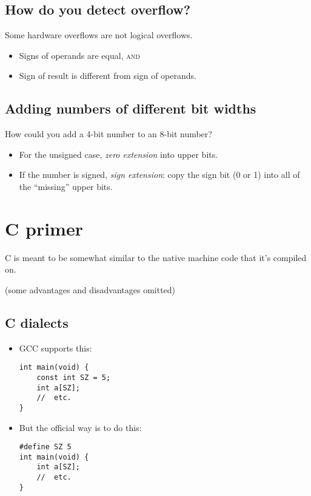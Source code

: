 \subsection{How do you detect overflow?}
Some hardware overflows are not logical overflows.
\begin{itemize}
	\item Signs of operands are equal, \textsc{and}
	\item Sign of result is different from sign of operands.
\end{itemize}

\subsection{Adding numbers of different bit widths}
How could you add a 4-bit number to an 8-bit number?
\begin{itemize}
	\item For the unsigned case, \emph{zero extension} into upper bits.
	\item If the number is signed, \emph{sign extension}: copy the sign bit (0 or 1) into all of the ``missing'' upper bits.
\end{itemize}

\section{C primer}
C is meant to be somewhat similar to the native machine code that it's compiled on. 

(some advantages and disadvantages omitted)

\subsection{C dialects}
\begin{itemize}
	\item GCC supports this:
\begin{verbatim}
int main(void) {
	const int SZ = 5;
	int a[SZ];
	//  etc.
}
\end{verbatim}
	\item But the official way is to do this:
\begin{verbatim}
#define SZ 5
int main(void) {
	int a[SZ];
	//  etc.
}
\end{verbatim}
\end{itemize}

